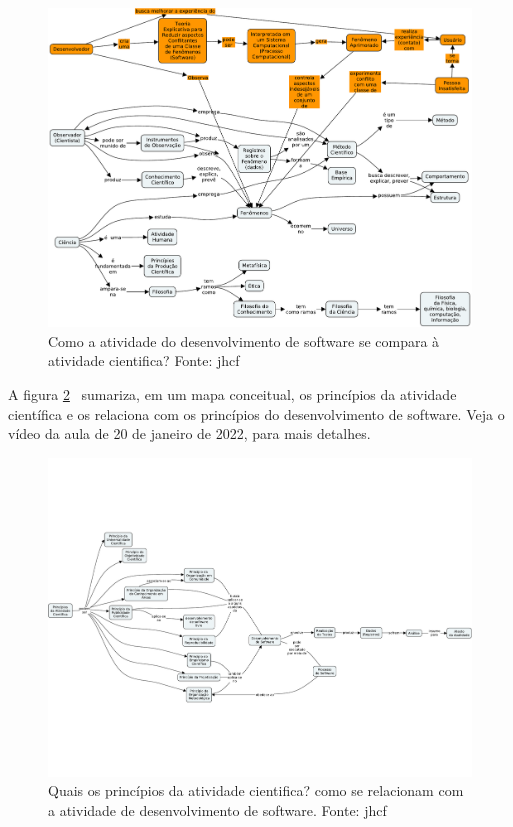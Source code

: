 \begin{figure}
    \centering
    \includegraphics[page=1,angle=90,width=1\textwidth]{1-Introducao/aulas/Desenvolvimento-de-Software-Ciencia-e-Filosofia.pdf}
    \caption{Como a atividade do desenvolvimento de software se compara à atividade cientifica? Fonte: jhcf}
    \label{fig:desenv-sw-ciencia-filosofia}
\end{figure}

A figura \ref{fig:principios:ativ:cientifica}~ sumariza, em um mapa conceitual, os princípios da atividade científica e os relaciona com os princípios do desenvolvimento de software.
Veja o vídeo da aula de 20 de janeiro de 2022, para mais detalhes.

\begin{figure}
    \centering
    \includegraphics[page=1,angle=90,width=1\textwidth]{1-Introducao/aulas/Principios-da-atividade-cientifica.pdf}
    \caption{Quais os princípios da  atividade cientifica? como se relacionam com a atividade de desenvolvimento de software. Fonte: jhcf}
    \label{fig:principios:ativ:cientifica}
\end{figure}
